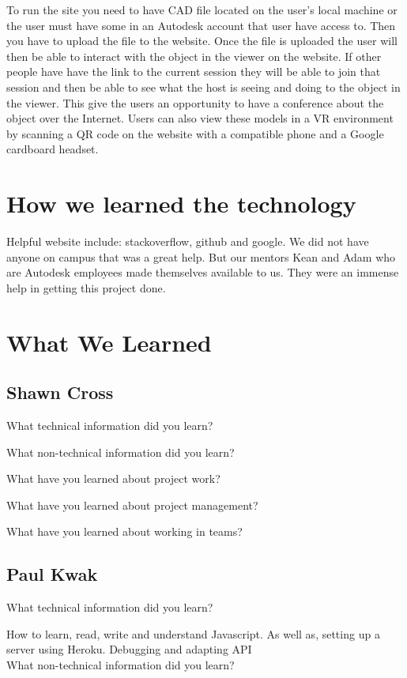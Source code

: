 \documentclass[letterpaper, 10pt, draftclsnofoot, compsoc, onecolumn]{IEEEtran}
\begin{document}
To run the site you need to have CAD file located on the user's local machine or the user must have some in an Autodesk account that user have access to. Then you have to upload the file to the website. Once the file is uploaded the user will then be able to interact with the object in the viewer on the website. If other people have have the link to the current session they will be able to join that session and then be able to see what the host is seeing and doing to the object in the viewer. This give the users an opportunity to have a conference about the object over the Internet. Users can also view these models in a VR environment by scanning a QR code on the website with a compatible phone and a Google cardboard headset.\\

\section{How we learned the technology}
Helpful website include: stackoverflow, github and google. We did not have anyone on campus that was a great help. But our mentors Kean and Adam who are Autodesk employees made themselves available to us. They were an immense help in getting this project done.

\section{What We Learned}
\subsection{Shawn Cross}
What technical information did you learn?

What non-technical information did you learn?

What have you learned about project work?

What have you learned about project management?

What have you learned about working in teams?

\subsection{Paul Kwak}
What technical information did you learn?

How to learn, read, write and understand Javascript. As well as, setting up a server using Heroku. Debugging and adapting API\\

What non-technical information did you learn?
\end{document}
